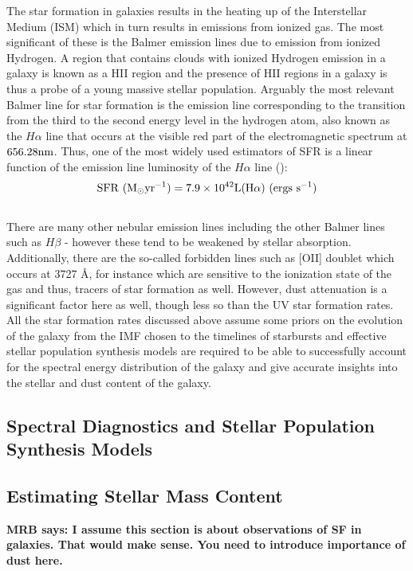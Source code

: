 The star formation in galaxies results in the heating up of the Interstellar Medium (ISM) which in turn results in emissions from ionized gas. The most significant of these is the Balmer emission lines due to emission from ionized Hydrogen. A region that contains clouds with ionized Hydrogen emission in a galaxy is known as a HII region and the presence of HII regions in a galaxy is thus a probe of a young massive stellar population. Arguably the most relevant Balmer line for star formation is the emission line corresponding to the transition from the third to the second energy level in the hydrogen atom, also known as the $H\alpha$ line that occurs at the visible red part of the electromagnetic spectrum at $656.28 {\rm nm}$. Thus, one of the most widely used estimators of SFR is a linear function of the emission line luminosity of the $H\alpha$ line (\citet{1994ApJ...435...22K, 1998ApJ...498..106M}):
$${\rm SFR}\hbox{ }({\rm M}_{\odot} {\rm yr}^{-1}) = 7.9 \times 10^{42} {\rm L}({\rm H}\alpha) \hbox{ }({\rm ergs }\hbox{ } {\rm s}^{-1})$$\\

There are many other nebular emission lines including the other Balmer lines such as $H\beta$ - however these tend to be weakened by stellar absorption. Additionally, there are the so-called forbidden lines such as [OII] doublet which occurs at 3727 \AA, for instance which are sensitive to the ionization state of the gas and thus, tracers of star formation as well. However, dust attenuation is a significant factor here as well, though less so than the UV star formation rates. All the star formation rates discussed above assume some priors on the evolution of the galaxy from the IMF chosen to the timelines of starbursts and effective stellar population synthesis models are required to be able to successfully account for the spectral energy distribution of the galaxy and give accurate insights into the stellar and dust content of the galaxy.\\

\subsection{Spectral Diagnostics and Stellar Population Synthesis Models}

\subsection{Estimating Stellar Mass Content}


\label{sed}
{\bf MRB says: I assume this section is about observations 
of SF in galaxies. That would make sense. You need to 
introduce importance of dust here.}

